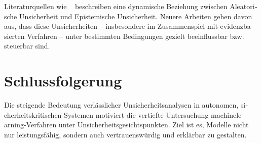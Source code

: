 \begin{otherlanguage}{ngerman}
Literaturquellen wie ~\parencite{ArthurHoarau2025} beschreiben eine dynamische Beziehung zwischen \gls{Aleatorische Unsicherheit} und \gls{Epistemische Unsicherheit}. Neuere Arbeiten gehen davon aus, dass diese Unsicherheiten – insbesondere im Zusammenspiel mit evidenzbasierten Verfahren – unter bestimmten Bedingungen gezielt beeinflussbar bzw. steuerbar sind.

\section{Schlussfolgerung}

Die steigende Bedeutung verlässlicher Unsicherheitsanalysen in autonomen, sicherheitskritischen Systemen motiviert die vertiefte Untersuchung \gls{machinelearning}-Verfahren unter Unsicherheitsgesichtspunkten. Ziel ist es, Modelle nicht nur leistungsfähig, sondern auch vertrauenswürdig und erklärbar zu gestalten.
\end{otherlanguage}
